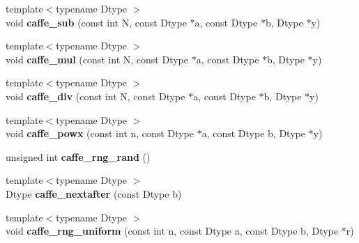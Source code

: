 \begin{DoxyCompactItemize}
\item 
{\footnotesize template$<$typename Dtype $>$ }\\void {\bfseries caffe\+\_\+sub} (const int N, const Dtype $\ast$a, const Dtype $\ast$b, Dtype $\ast$y)\hypertarget{namespacecaffe_a4f060e0e4e9c8124183ca9ae204b98d6}{}\label{namespacecaffe_a4f060e0e4e9c8124183ca9ae204b98d6}

\item 
{\footnotesize template$<$typename Dtype $>$ }\\void {\bfseries caffe\+\_\+mul} (const int N, const Dtype $\ast$a, const Dtype $\ast$b, Dtype $\ast$y)\hypertarget{namespacecaffe_a4a18af2041187d06c691e7b6ad6dd4e2}{}\label{namespacecaffe_a4a18af2041187d06c691e7b6ad6dd4e2}

\item 
{\footnotesize template$<$typename Dtype $>$ }\\void {\bfseries caffe\+\_\+div} (const int N, const Dtype $\ast$a, const Dtype $\ast$b, Dtype $\ast$y)\hypertarget{namespacecaffe_aac610bed3b50490209909127e58f5a58}{}\label{namespacecaffe_aac610bed3b50490209909127e58f5a58}

\item 
{\footnotesize template$<$typename Dtype $>$ }\\void {\bfseries caffe\+\_\+powx} (const int n, const Dtype $\ast$a, const Dtype b, Dtype $\ast$y)\hypertarget{namespacecaffe_a557c4b097a2e180592ad179deebee38f}{}\label{namespacecaffe_a557c4b097a2e180592ad179deebee38f}

\item 
unsigned int {\bfseries caffe\+\_\+rng\+\_\+rand} ()\hypertarget{namespacecaffe_a9cf246cbdccdda0a777438c1d1202dbd}{}\label{namespacecaffe_a9cf246cbdccdda0a777438c1d1202dbd}

\item 
{\footnotesize template$<$typename Dtype $>$ }\\Dtype {\bfseries caffe\+\_\+nextafter} (const Dtype b)\hypertarget{namespacecaffe_a105d7928b8db2c72aa13b50ffb16df87}{}\label{namespacecaffe_a105d7928b8db2c72aa13b50ffb16df87}

\item 
{\footnotesize template$<$typename Dtype $>$ }\\void {\bfseries caffe\+\_\+rng\+\_\+uniform} (const int n, const Dtype a, const Dtype b, Dtype $\ast$r)\hypertarget{namespacecaffe_aaa5652f7a969f004b364af65a7fa12c4}{}\label{namespacecaffe_aaa5652f7a969f004b364af65a7fa12c4}


\end{DoxyCompactItemize}
